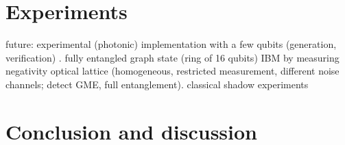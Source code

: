 \documentclass[
reprint,
aps,
pra,
]{revtex4-2}
\theoremstyle{plain}
\theoremstyle{definition}
\begin{document}



\section{Experiments}\label{sec:experiments}
future: experimental (photonic) implementation with a few qubits (generation, verification) \cite{luEntanglementStructureEntanglement2018}.
fully entangled graph state (ring of 16 qubits) IBM by measuring negativity \cite{wang16qubitIBMUniversal2018}
optical lattice \cite{zhouSchemeCreateVerify2022} (homogeneous, restricted measurement, different noise channels; detect GME, full entanglement).
classical shadow experiments \cite{zhangExperimentalQuantumState2021}
\cite{elbenMixedstateEntanglementLocal2020}

\section{Conclusion and discussion}

\begin{acknowledgments}
\end{acknowledgments}



%


\onecolumngrid
\appendix



\end{document}
